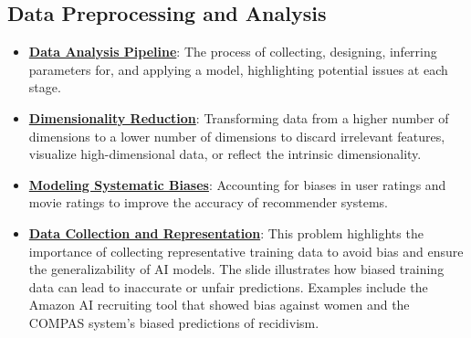 \documentclass{article}%
\begin{document}
\subsection{Data Preprocessing and Analysis}%
\label{subsec:DataPreprocessingandAnalysis}%
\begin{itemize}[leftmargin=*]%
\item \href{https://purdue.brightspace.com/d2l/common/assets/pdfjs-d2l-dist/1.0.14-legacy/web/viewer.html?file=\%2Fcontent\%2Fenforced\%2F1095467-wl.202510.CS.24300.001\%2F10L1-CrossValidation.pdf\%3Fou\%3D1095467\&lang=en-us\&container=d2l-fileviewer-rendered-pdf\&fullscreen=d2l-fileviewer-rendered-pdf-dialog\&height=667#page=26}{\textbf{Data Analysis Pipeline}}: The process of collecting, designing, inferring parameters for, and applying a model, highlighting potential issues at each stage.%
\item \href{https://purdue.brightspace.com/d2l/common/assets/pdfjs-d2l-dist/1.0.14-legacy/web/viewer.html?file=\%2Fcontent\%2Fenforced\%2F1095467-wl.202510.CS.24300.001\%2F11L2-svd-pca-recommender.pdf\%3Fou\%3D1095467\&lang=en-us\&container=d2l-fileviewer-rendered-pdf\&fullscreen=d2l-fileviewer-rendered-pdf-dialog\&height=667#page=8}{\textbf{Dimensionality Reduction}}: Transforming data from a higher number of dimensions to a lower number of dimensions to discard irrelevant features, visualize high-dimensional data, or reflect the intrinsic dimensionality.%
\item \href{https://purdue.brightspace.com/d2l/common/assets/pdfjs-d2l-dist/1.0.14-legacy/web/viewer.html?file=\%2Fcontent\%2Fenforced\%2F1095467-wl.202510.CS.24300.001\%2F11L2-svd-pca-recommender.pdf\%3Fou\%3D1095467\&lang=en-us\&container=d2l-fileviewer-rendered-pdf\&fullscreen=d2l-fileviewer-rendered-pdf-dialog\&height=667#page=40}{\textbf{Modeling Systematic Biases}}: Accounting for biases in user ratings and movie ratings to improve the accuracy of recommender systems.%
\item \href{https://purdue.brightspace.com/d2l/common/assets/pdfjs-d2l-dist/1.0.14-legacy/web/viewer.html?file=\%2Fcontent\%2Fenforced\%2F1095467-wl.202510.CS.24300.001\%2F16L2-ethics.pdf\%3Fou\%3D1095467\&lang=en-us\&container=d2l-fileviewer-rendered-pdf\&fullscreen=d2l-fileviewer-rendered-pdf-dialog\&height=667#page=22}{\textbf{Data Collection and Representation}}: This problem highlights the importance of collecting representative training data to avoid bias and ensure the generalizability of AI models. The slide illustrates how biased training data can lead to inaccurate or unfair predictions. Examples include the Amazon AI recruiting tool that showed bias against women and the COMPAS system's biased predictions of recidivism.%
\end{itemize}
\end{document}
